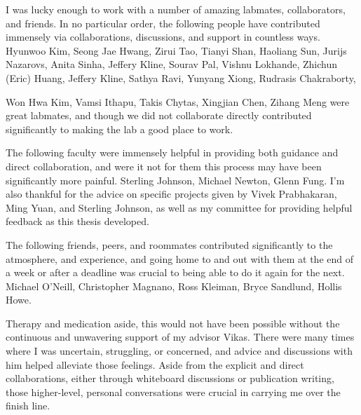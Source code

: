 \begin{acks}


I was lucky enough to work with a number of amazing labmates, collaborators, and friends. In no particular order, the following people have contributed immensely via collaborations, discussions, and support in countless ways.
Hyunwoo Kim, Seong Jae Hwang, Zirui Tao, Tianyi Shan, Haoliang Sun, Jurijs Nazarovs, Anita Sinha, Jeffery Kline, Sourav Pal, Vishnu Lokhande, Zhichun (Eric) Huang, Jeffery Kline, Sathya Ravi, Yunyang Xiong, Rudrasis Chakraborty,

Won Hwa Kim, Vamsi Ithapu, Takis Chytas, Xingjian Chen, Zihang Meng were great labmates, and though we did not collaborate directly contributed significantly to making the lab a good place to work.

The following faculty were immensely helpful in providing both guidance and direct collaboration, and were it not for them this process may have been significantly more painful.
Sterling Johnson, Michael Newton, Glenn Fung. 
I'm also thankful for the advice on specific projects given by Vivek Prabhakaran, Ming Yuan, and Sterling Johnson, as well as my committee for providing helpful feedback as this thesis developed.

The following friends, peers, and roommates contributed significantly to the atmosphere, and experience,
and going home to and out with them at the end of a week or after a deadline was crucial to being able to do it again for the next. Michael O'Neill, Christopher Magnano, Ross Kleiman, Bryce Sandlund, Hollis Howe.

Therapy and medication aside, this would not have been possible without the continuous and unwavering support of my advisor Vikas. There were many times where I was uncertain, struggling, or concerned,
and advice and discussions with him helped alleviate those feelings. Aside from the explicit and direct collaborations, either through whiteboard discussions or publication writing, those higher-level, personal conversations were crucial in carrying me over the finish line.


\end{acks}
